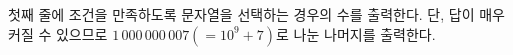 첫째 줄에 조건을 만족하도록 문자열을 선택하는 경우의 수를 출력한다. 단, 답이 매우 커질 수 있으므로 $1\, 000\, 000\, 007(=10^9+7)$로 나눈 나머지를 출력한다.